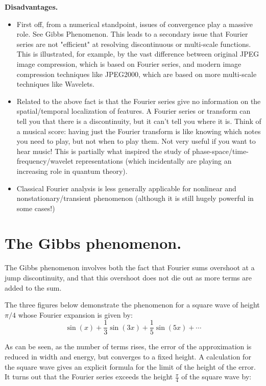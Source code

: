 \textbf{Disadvantages.}


\begin{itemize}
    \item First off, from a numerical standpoint, issues of convergence play a massive role. See Gibbs Phenomenon. This leads to a secondary issue that Fourier series are not "efficient" at resolving discontinuous or multi-scale functions. This is illustrated, for example, by the vast difference between original JPEG image compression, which is based on Fourier series, and modern image compression techniques like JPEG2000, which are based on more multi-scale techniques like Wavelets.
    
    \item Related to the above fact is that the Fourier series give no information on the spatial/temporal localization of features. A Fourier series or transform can tell you that there is a discontinuity, but it can't tell you where it is. Think of a musical score: having just the Fourier transform is like knowing which notes you need to play, but not when to play them. Not very useful if you want to hear music! This is partially what inspired the study of phase-space/time-frequency/wavelet representations (which incidentally are playing an increasing role in quantum theory).
    
    \item Classical Fourier analysis is less generally applicable for nonlinear and nonstationary/transient phenomenon (although it is still hugely powerful in some cases!)
    
\end{itemize}



\section{The Gibbs phenomenon.}
\label{sec2}

\par

The Gibbs phenomenon involves both the fact that Fourier sums overshoot at a jump discontinuity, and that this overshoot does not die out as more terms are added to the sum.
\par 

The three figures below demonstrate the phenomenon for a square wave of height $\pi/4$ whose Fourier expansion is given by: 
 \[\sin (x)+\frac{1}{3} \sin (3 x)+\frac{1}{5} \sin (5 x)+\cdots\]    

As can be seen, as the number of terms rises, the error of the approximation is reduced in width and energy, but converges to a fixed height. A calculation for the square wave gives an explicit formula for the limit of the height of the error. It turns out that the Fourier series exceeds the height  $\frac{\pi}{4}$ of the square wave by:

